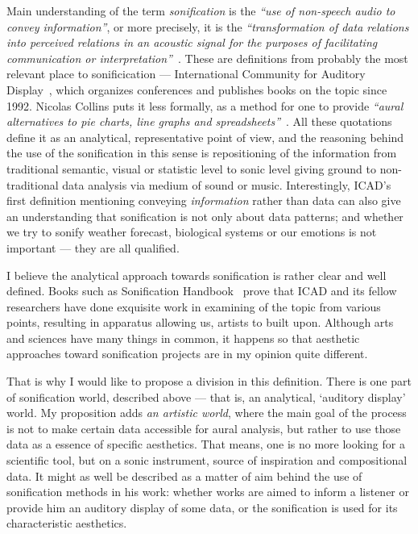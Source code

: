 \documentclass[12pt,a4paper,oneside]{report}
\begin{document}
Main understanding of the term \emph{sonification} is the \emph{``use of non-speech audio to convey information''}, or more precisely, it is the \emph{``transformation of data relations into perceived relations in an acoustic signal for the purposes of facilitating communication or interpretation''}~\cite[p.~1]{Fitch}. These are definitions from probably the most relevant place to sonificication --- International Community for Auditory Display~\cite{icad}, which organizes conferences and publishes books on the topic since 1992. Nicolas Collins puts it less formally, as a method for one to provide \emph{``aural alternatives to pie charts, line graphs and spreadsheets''}~\cite[p.~7]{Collins2006}. All these quotations define it as an analytical, representative point of view, and the reasoning behind the use of the sonification in this sense is repositioning of the information from traditional semantic, visual or statistic level to sonic level giving ground to non-traditional data analysis via medium of sound or music. Interestingly, ICAD's first definition mentioning conveying \emph{information} rather than data can also give an understanding that sonification is not only about data patterns; and whether we try to sonify weather forecast, biological systems or our emotions is not important --- they are all qualified.

I believe the analytical approach towards sonification is rather clear and well defined. Books such as Sonification Handbook~\cite{Hermann2011} prove that ICAD and its fellow researchers have done exquisite work in examining of the topic from various points, resulting in apparatus allowing us, artists to built upon. Although arts and sciences have many things in common, it happens so that aesthetic approaches toward sonification projects are in my opinion quite different.

That is why I would like to propose a division in this definition. There is one part of sonification world, described above --- that is, an analytical, `auditory display' world. My proposition adds \emph{an artistic world}, where the main goal of the process is not to make certain data accessible for aural analysis, but rather to use those data as a essence of specific aesthetics. That means, one is no more looking for a scientific tool, but on a sonic instrument, source of inspiration and compositional data. It might as well be described as a matter of aim behind the use of sonification methods in his work: whether works are aimed to inform a listener or provide him an auditory display of some data, or the sonification is used for its characteristic aesthetics.
\end{document}

